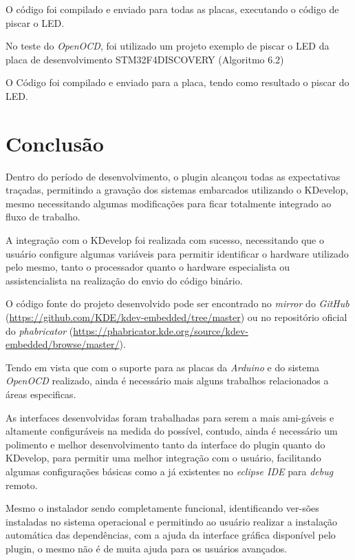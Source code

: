 

O código foi compilado e enviado para todas as placas, executando o código de piscar o LED.

No teste do \textit{OpenOCD}, foi utilizado um projeto exemplo de piscar o LED da placa de desenvolvimento STM32F4DISCOVERY (Algoritmo 6.2)



O Código foi compilado e enviado para a placa, tendo como resultado o piscar do LED.

\chapter{Conclusão}
Dentro do período de desenvolvimento, o plugin alcançou todas as expectativas traçadas,
permitindo a gravação dos sistemas embarcados utilizando o KDevelop, mesmo necessitando algumas modificações para ficar
totalmente integrado ao fluxo de trabalho.

A integração com o KDevelop foi realizada com sucesso, necessitando que o usuário configure algumas variáveis para permitir identificar o hardware utilizado pelo mesmo, tanto o processador quanto o hardware especialista ou assistencialista na realização do envio do código binário.

O código fonte do projeto desenvolvido pode ser encontrado no \textit{mirror} do \textit{GitHub} (\url{https://github.com/KDE/kdev-embedded/tree/master}) ou no repositório oficial do \textit{phabricator} (\url{https://phabricator.kde.org/source/kdev-embedded/browse/master/}).

Tendo em vista que com o suporte para as placas da \textit{Arduino} e do sistema \textit{OpenOCD} realizado, ainda é necessário mais alguns trabalhos relacionados a áreas especificas.

As interfaces desenvolvidas foram trabalhadas para serem a mais ami-gáveis e altamente configuráveis na medida do possível, contudo, ainda é necessário um polimento e melhor desenvolvimento tanto da interface do plugin quanto do KDevelop, para permitir uma melhor integração com o usuário, facilitando algumas configurações básicas como a já existentes no \textit{eclipse IDE} para \textit{debug} remoto.

Mesmo o instalador sendo completamente funcional, identificando ver-sões instaladas no sistema operacional e
permitindo ao usuário realizar a instalação automática das dependências, com a ajuda da interface gráfica disponível pelo plugin, o mesmo não é de muita ajuda para os usuários avançados.

